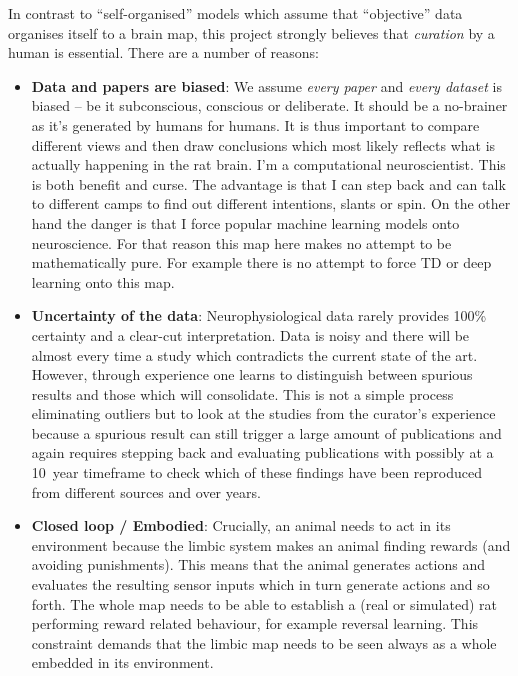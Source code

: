 \documentclass[12pt,a4paper]{article}
\begin{document}
In contrast to ``self-organised'' models which assume that
``objective'' data organises itself to a brain map, this project
strongly believes that \textsl{curation} by a human is
essential. There are a number of reasons:
\begin{itemize}
\item \textbf{Data and papers are biased}: We assume \textsl{every
  paper} and \textsl{every dataset} is biased -- be it subconscious,
  conscious or deliberate. It should be a no-brainer as it's generated
  by humans for humans. It is thus important to compare different
  views and then draw conclusions which most likely reflects what is
  actually happening in the rat brain. I'm a computational
  neuroscientist. This is both benefit and curse.  The advantage is
  that I can step back and can talk to different camps to find out
  different intentions, slants or spin. On the other hand the danger
  is that I force popular machine learning models onto
  neuroscience. For that reason this map here makes no attempt to be
  mathematically pure. For example there is no attempt to force TD
  or deep learning onto this map.
\item \textbf{Uncertainty of the data}: Neurophysiological data
  rarely provides 100\% certainty and a clear-cut
  interpretation. Data is noisy and there will be almost every time a
  study which contradicts the current state of the art. However,
  through experience one learns to distinguish between spurious
  results and those which will consolidate. This is not a simple
  process eliminating outliers but to look at the studies from the
  curator's experience because a spurious result can still trigger a
  large amount of publications and again requires stepping back and
  evaluating publications with possibly at a 10~year timeframe to check
  which of these findings have been reproduced from different sources
  and over years.
\item \textbf{Closed loop / Embodied}: Crucially, an animal needs to
  act in its environment because the limbic system makes an animal
  finding rewards (and avoiding punishments). This means that the
  animal generates actions and evaluates the resulting sensor inputs
  which in turn generate actions and so forth. The whole map needs to
  be able to establish a (real or simulated) rat performing reward
  related behaviour, for example reversal learning. This constraint
  demands that the limbic map needs to be seen always as a whole
  embedded in its environment.
\end{itemize}
\end{document}
